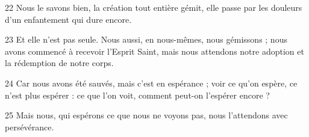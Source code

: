 
22 Nous le savons bien, la création tout entière gémit, elle passe par les douleurs d’un enfantement qui dure encore.

23 Et elle n’est pas seule. Nous aussi, en nous-mêmes, nous gémissons ; nous avons commencé à recevoir l’Esprit Saint, mais nous attendons notre adoption et la rédemption de notre corps.

24 Car nous avons été sauvés, mais c’est en espérance ; voir ce qu’on espère, ce n’est plus espérer : ce que l’on voit, comment peut-on l’espérer encore ?

25 Mais nous, qui espérons ce que nous ne voyons pas, nous l’attendons avec persévérance.

